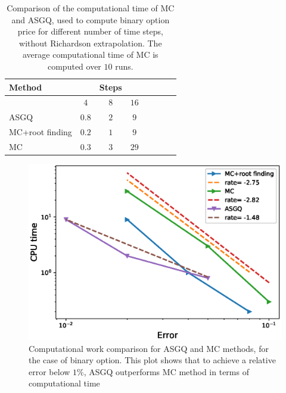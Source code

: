 \FloatBarrier

\begin{table}[h!]
	\centering
	\begin{tabular}{l*{6}{c}r}
		\toprule[1.5pt]
	Method & & Steps  &     \\
	\hline
		         & $4$ & $8$ & $16$ &   \\
		\hline
		ASGQ   & $0.8$ & $2$ & $9$  \\
		\hline
		MC+root finding     & $0.2$ & $1$ & $9$  \\
		\hline 
		MC     & $0.3$ & $3$ & $29$  \\
				\bottomrule[1.25pt]
	\end{tabular}
	\caption{Comparison of the computational time of  MC and ASGQ, used to compute binary option price  for different number of time steps, without Richardson extrapolation. The average computational time of MC is computed over $10$ runs.}
	\label{Comparsion of the computational time of  MC and MISC, used to compute Binary option price  for different number of time steps, without Richardson extrapolation}
\end{table}



\FloatBarrier
\begin{figure}[h!]
\centering
\includegraphics[width=0.4\linewidth]{./figures/Binary_Complexity_rates/error_vs_time}
	\caption{Computational work comparison for ASGQ and MC methods, for the case of binary  option. This plot shows that to achieve a relative error below $1\%$, ASGQ outperforms  MC method in terms of computational time}
	\label{fig:Complexity plot for MC and MISC , Binary, Non rich}
\end{figure}

